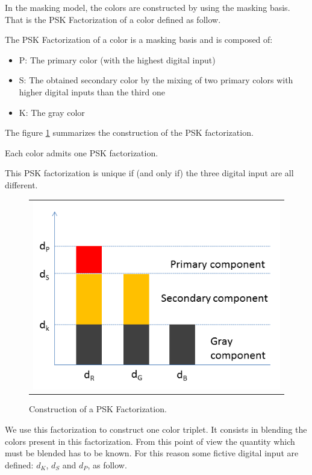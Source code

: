 In the masking model, the colors are constructed by using the masking basis. That is the PSK Factorization of a color defined as follow.\par

\begin{defi}
The PSK Factorization of a color is a masking basis and is composed of:
\begin{itemize}
\item P: The primary color (with the highest digital input)
\item S: The obtained secondary color by the mixing of two primary colors with higher digital inputs than the third one
\item K: The gray color
\end{itemize}
\label{defiPSKfactor}
\end{defi}

The figure \ref{PSKFactorisation} summarizes the construction of the PSK factorization.\par
\begin{example}[Remark]
Each color admits one PSK factorization.\par
This PSK factorization is unique if (and only if) the three digital input are all different.
\end{example}

\begin{figure}[!h]
\begin{center}
\begin{tabular}{c}
\includegraphics[width=0.6\columnwidth]{03_Rgb2XYZDisplayModule/images/psk_fact.png}
\end{tabular}
\end{center}
\caption{Construction of a PSK Factorization.}\label{PSKFactorisation}
\end{figure}

We use this factorization to construct one color triplet. It consists in blending the colors present in this factorization. 
From this point of view the quantity which must be blended has to be known. 
For this reason some fictive digital input are defined: $d_{K}$, $d_{S}$ and $d_{P}$, as follow.\par

